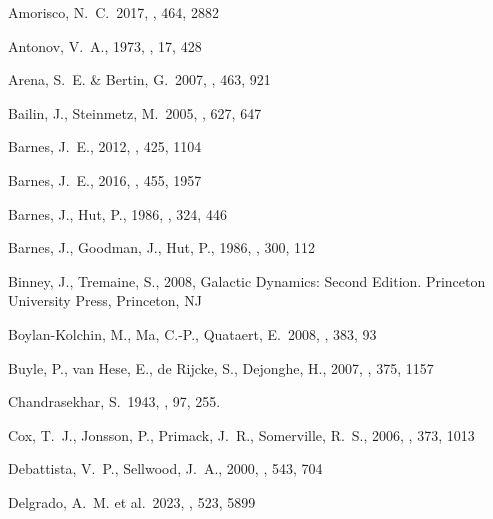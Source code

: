 \documentclass[fleqn,usenatbib]{mnras}
\begin{document}
\begin{thebibliography}{}

    \raggedright

     Amorisco, N.~C.\ 2017, \mnras, 464, 2882 %
    
     Antonov, V.~A., 1973, \sovast, 17, 428

     Arena, S.~E. \& Bertin, G.\ 2007, \aap, 463, 921 %

     Bailin, J., Steinmetz, M.\ 2005, \apj, 627, 647
    
     Barnes, J.~E., 2012, \mnras, 425, 1104 %

     Barnes, J.~E., 2016, \mnras, 455, 1957 %
    
     Barnes, J., Hut, P., 1986, \nat, 324, 446 %
    
     Barnes, J., Goodman, J., Hut, P., 1986, \apj, 300, 112 %
        
     Binney, J., Tremaine, S., 2008, Galactic Dynamics: Second Edition. Princeton University Press, Princeton, NJ

     Boylan-Kolchin, M., Ma, C.-P., Quataert, E.\ 2008, \mnras, 383, 93 %
    
     Buyle, P., van Hese, E., de Rijcke, S., Dejonghe, H., 2007, \mnras, 375, 1157 %

     Chandrasekhar, S.\ 1943, \apj, 97, 255. %
    
     Cox, T.~J., Jonsson, P., Primack, J.~R., Somerville, R.~S., 2006, \mnras, 373, 1013 %

     Debattista, V.~P., Sellwood, J.~A., 2000, \apj, 543, 704

     Delgrado, A.~M. et al.\ 2023, \mnras, 523, 5899


\end{thebibliography}
\end{document}

